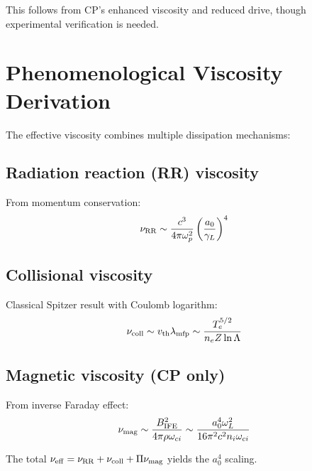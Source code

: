 \documentclass[aps,pre,twocolumn,showpacs,superscriptaddress]{revtex4-2}
\theoremstyle{definition}
\begin{document}
This follows from CP's enhanced viscosity and reduced drive, though experimental verification is needed.

\section{Phenomenological Viscosity Derivation}

The effective viscosity combines multiple dissipation mechanisms:

\subsection{Radiation reaction (RR) viscosity}
From momentum conservation:
\begin{equation}
\nu_{\rm RR} \sim \frac{c^3}{4\pi\omega_p^2} \left(\frac{a_0}{\gamma_L}\right)^4
\end{equation}

\subsection{Collisional viscosity}
Classical Spitzer result with Coulomb logarithm:
\begin{equation}
\nu_{\rm coll} \sim v_{\rm th}\lambda_{\rm mfp} \sim \frac{T_e^{5/2}}{n_e Z\ln\Lambda}
\end{equation}

\subsection{Magnetic viscosity (CP only)}
From inverse Faraday effect:
\begin{equation}
\nu_{\rm mag} \sim \frac{B_{\rm IFE}^2}{4\pi\rho\omega_{ci}} \sim \frac{a_0^4\omega_L^2}{16\pi^2 c^2 n_i\omega_{ci}}
\end{equation}

The total $\nu_{\rm eff} = \nu_{\rm RR} + \nu_{\rm coll} + \Pi\nu_{\rm mag}$ yields the $a_0^4$ scaling.


\end{document}
